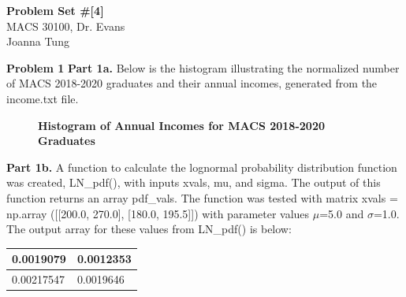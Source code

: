 \documentclass[letterpaper,12pt]{article}
\theoremstyle{definition}
\begin{document}
\begin{flushleft}
  \textbf{\large{Problem Set \#[4]}} \\
  MACS 30100, Dr. Evans \\
  Joanna Tung
\end{flushleft}

\vspace{5mm}

\noindent\textbf{Problem 1}
\noindent\newline\textbf{Part 1a. }Below is the histogram illustrating the normalized number of MACS 2018-2020 graduates and their annual incomes, generated from the income.txt file.

\begin{figure}[htb]\centering\captionsetup{width=4.0in}
  \caption{\textbf{Histogram of Annual Incomes for MACS 2018-2020 Graduates}}\label{FigPS4_1a}
\end{figure}

\noindent\newline\textbf{Part 1b.} A function to calculate the lognormal probability distribution function was created, LN\_pdf(), with inputs xvals, mu, and sigma. The output of this function returns an array pdf\_vals. The function was tested with matrix xvals = np.array ([[200.0, 270.0], [180.0, 195.5]]) with parameter values $\mu$=5.0 and $\sigma$=1.0. The output array for these values from LN\_pdf() is below:

\begin{center}
    \caption{Test array output from function LN_pdf()'}
    \begin{tabular}{ | l | l | }
    \hline
    0.0019079 & 0.0012353 \\ \hline
    0.00217547 & 0.0019646 \\ \hline
    \end{tabular}
\end{center}
\end{document}
